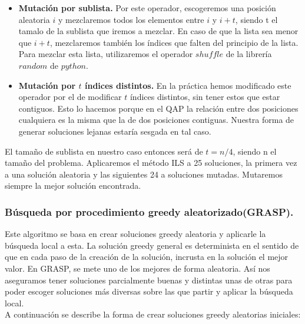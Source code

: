 \begin{itemize}
	\item \textbf{Mutación por sublista.} Por este operador, escogeremos una posición aleatoria $i$ y mezclaremos todos los elementos entre $i$ y $i+t$, siendo t el tamalo de la sublista que  iremos a mezclar. En caso de que la lista sea menor que $i+t$, mezclaremos también los índices que falten del principio de la lista. Para mezclar esta lista, utilizaremos el operador $shuffle$ de la librería $random$ de $python$.
	
	\item \textbf{Mutación por $t$ índices distintos.} En la práctica hemos modificado este operador por el de modificar $t$ índices distintos, sin tener estos que estar contiguos. Esto lo hacemos porque en el QAP la relación entre dos posiciones cualquiera es la misma que la de dos posiciones contiguas. Nuestra forma de generar soluciones lejanas estaría sesgada en tal caso.
\end{itemize}

El tamaño de sublista en nuestro caso entonces será de $t=n/4$, siendo n el tamaño del problema. Aplicaremos el método ILS a 25 soluciones, la primera vez a una solución aleatoria y las siguientes 24 a soluciones mutadas. Mutaremos siempre la mejor solución encontrada.

\subsubsection{Búsqueda por procedimiento greedy aleatorizado(GRASP).}

Este algoritmo se basa en crear soluciones greedy aleatoria y aplicarle la búsqueda local a esta. La solución greedy general es determinista en el sentido de que en cada paso de la creación de la solución, incrusta en la solución el mejor valor. En GRASP, se mete uno de los mejores de forma aleatoria. Así nos aseguramos tener soluciones parcialmente buenas y distintas unas de otras para poder escoger soluciones más diversas sobre las que partir y aplicar la búsqueda local.\\

A continuación se describe la forma de crear soluciones greedy aleatorias iniciales:

